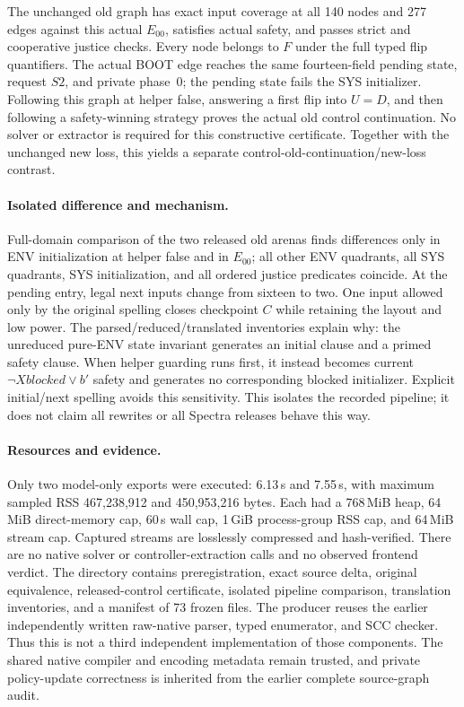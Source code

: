 The unchanged old graph has exact input coverage at all 140 nodes and
277 edges against this actual $E_{00}$, satisfies actual safety, and
passes strict and cooperative justice checks. Every node belongs to
$F$ under the full typed flip quantifiers. The actual BOOT edge reaches
the same fourteen-field pending state, request $S2$, and private phase~0;
the pending state fails the SYS initializer. Following this graph at
helper false, answering a first flip into $U=D$, and then following a
safety-winning strategy proves the actual old control continuation.
No solver or extractor is required for this constructive certificate.
Together with the unchanged new loss, this yields a separate
control-old-continuation/new-loss contrast.

\paragraph{Isolated difference and mechanism.}
Full-domain comparison of the two released old arenas finds differences
only in ENV initialization at helper false and in $E_{00}$; all other
ENV quadrants, all SYS quadrants, SYS initialization, and all ordered
justice predicates coincide. At the pending entry, legal next inputs
change from sixteen to two. One input allowed only by the original
spelling closes checkpoint $C$ while retaining the layout and low power.
The parsed/reduced/translated inventories explain why: the unreduced
pure-ENV state invariant generates an initial clause and a primed safety
clause. When helper guarding runs first, it instead becomes current
$\neg Xblocked\lor b'$ safety and generates no corresponding blocked
initializer. Explicit initial/next spelling avoids this sensitivity.
This isolates the recorded pipeline; it does not claim all rewrites or
all Spectra releases behave this way.

\paragraph{Resources and evidence.}
Only two model-only exports were executed: 6.13\,s and 7.55\,s, with
maximum sampled RSS 467,238,912 and 450,953,216 bytes. Each had a
768\,MiB heap, 64\,MiB direct-memory cap, 60\,s wall cap, 1\,GiB
process-group RSS cap, and 64\,MiB stream cap. Captured streams are
losslessly compressed and hash-verified. There are no native solver or
controller-extraction calls and no observed frontend verdict.
The directory 
contains preregistration, exact source delta, original equivalence,
released-control certificate, isolated pipeline comparison, translation
inventories, and a manifest of 73 frozen files.
The producer reuses the earlier independently written raw-native parser,
typed enumerator, and SCC checker. Thus this is not a third independent
implementation of those components. The shared native compiler and
encoding metadata remain trusted, and private policy-update correctness
is inherited from the earlier complete source-graph audit.

